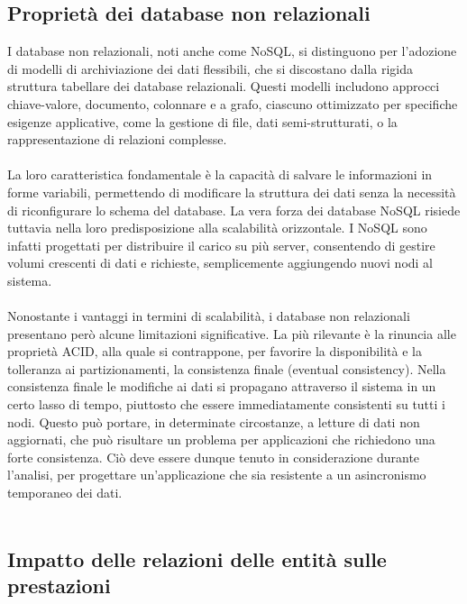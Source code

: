 \subsection{Proprietà dei database non relazionali}

I database non relazionali, noti anche come NoSQL,
si distinguono per l'adozione di modelli di archiviazione dei dati flessibili,
che si discostano dalla rigida struttura tabellare dei database relazionali.
Questi modelli includono approcci chiave-valore, documento, colonnare e a grafo,
ciascuno ottimizzato per specifiche esigenze applicative,
come la gestione di file, dati semi-strutturati, o la rappresentazione di relazioni complesse.\\
\\
La loro caratteristica fondamentale è la capacità di salvare le informazioni in forme variabili,
permettendo di modificare la struttura dei dati senza la necessità di riconfigurare lo schema del database.
La vera forza dei database NoSQL risiede tuttavia
nella loro predisposizione alla scalabilità orizzontale.
I NoSQL sono infatti progettati per distribuire il carico su più server,
consentendo di gestire volumi crescenti di dati e richieste,
semplicemente aggiungendo nuovi nodi al sistema.\\
\\
Nonostante i vantaggi in termini di scalabilità,
i database non relazionali presentano però alcune limitazioni significative.
La più rilevante è la rinuncia alle proprietà ACID, alla quale si contrappone,
per favorire la disponibilità e la tolleranza ai partizionamenti,
la consistenza finale (eventual consistency).
Nella consistenza finale le modifiche ai dati 
si propagano attraverso il sistema in un certo lasso di tempo,
piuttosto che essere immediatamente consistenti su tutti i nodi.
Questo può portare, in determinate circostanze, a letture di dati non aggiornati,
che può risultare un problema per applicazioni che richiedono una forte consistenza.
Ciò deve essere dunque tenuto in considerazione durante l'analisi,
per progettare un'applicazione che sia resistente a un asincronismo temporaneo dei dati.\\
\\





\subsection{Impatto delle relazioni delle entità sulle prestazioni}

